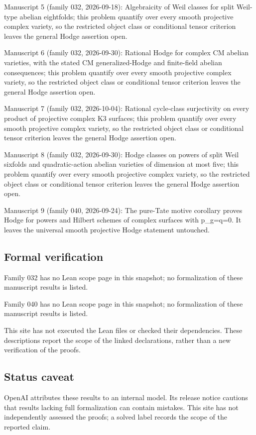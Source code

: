 \documentclass[11pt]{article}
\begin{document}
Manuscript 5 (family 032, 2026-09-18): Algebraicity of Weil classes for split Weil-type abelian eightfolds; this problem quantify over every smooth projective complex variety, so the restricted object class or conditional tensor criterion leaves the general Hodge assertion open.

Manuscript 6 (family 032, 2026-09-30): Rational Hodge for complex CM abelian varieties, with the stated CM generalized-Hodge and finite-field abelian consequences; this problem quantify over every smooth projective complex variety, so the restricted object class or conditional tensor criterion leaves the general Hodge assertion open.

Manuscript 7 (family 032, 2026-10-04): Rational cycle-class surjectivity on every product of projective complex K3 surfaces; this problem quantify over every smooth projective complex variety, so the restricted object class or conditional tensor criterion leaves the general Hodge assertion open.

Manuscript 8 (family 032, 2026-09-30): Hodge classes on powers of split Weil sixfolds and quadratic-action abelian varieties of dimension at most five; this problem quantify over every smooth projective complex variety, so the restricted object class or conditional tensor criterion leaves the general Hodge assertion open.

Manuscript 9 (family 040, 2026-09-24): The pure-Tate motive corollary proves Hodge for powers and Hilbert schemes of complex surfaces with p\_g=q=0. It leaves the universal smooth projective Hodge statement untouched.

\subsection{Formal verification}
Family 032 has no Lean scope page in this snapshot; no formalization of these manuscript results is listed.

Family 040 has no Lean scope page in this snapshot; no formalization of these manuscript results is listed.

This site has not executed the Lean files or checked their dependencies. These descriptions report the scope of the linked declarations, rather than a new verification of the proofs.

\subsection{Status caveat}
OpenAI attributes these results to an internal model. Its release notice cautions that results lacking full formalization can contain mistakes. This site has not independently assessed the proofs; a solved label records the scope of the reported claim.
\end{document}
